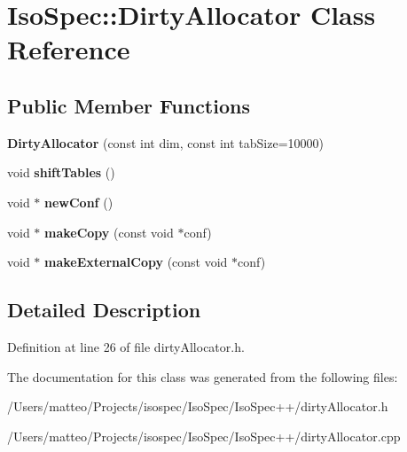 \hypertarget{class_iso_spec_1_1_dirty_allocator}{}\section{Iso\+Spec\+:\+:Dirty\+Allocator Class Reference}
\label{class_iso_spec_1_1_dirty_allocator}
\subsection*{Public Member Functions}
\begin{DoxyCompactItemize}
\item 
\mbox{\label{class_iso_spec_1_1_dirty_allocator_a0a2cec7004fa67775b209688fef5c566}} 
{\bfseries Dirty\+Allocator} (const int dim, const int tab\+Size=10000)
\item 
\mbox{\label{class_iso_spec_1_1_dirty_allocator_afcaa8b5465f58d8a55dcd15a95921e4f}} 
void {\bfseries shift\+Tables} ()
\item 
\mbox{\label{class_iso_spec_1_1_dirty_allocator_a345a18940d01c2943f232591e87fe654}} 
void $\ast$ {\bfseries new\+Conf} ()
\item 
\mbox{\label{class_iso_spec_1_1_dirty_allocator_ae3e30ff9aeb6649c8f01b07282711ac9}} 
void $\ast$ {\bfseries make\+Copy} (const void $\ast$conf)
\item 
\mbox{\label{class_iso_spec_1_1_dirty_allocator_af13586082e8269f496c80183c6eb7703}} 
void $\ast$ {\bfseries make\+External\+Copy} (const void $\ast$conf)
\end{DoxyCompactItemize}


\subsection{Detailed Description}


Definition at line 26 of file dirty\+Allocator.\+h.



The documentation for this class was generated from the following files\+:\begin{DoxyCompactItemize}
\item 
/\+Users/matteo/\+Projects/isospec/\+Iso\+Spec/\+Iso\+Spec++/dirty\+Allocator.\+h\item 
/\+Users/matteo/\+Projects/isospec/\+Iso\+Spec/\+Iso\+Spec++/dirty\+Allocator.\+cpp\end{DoxyCompactItemize}
